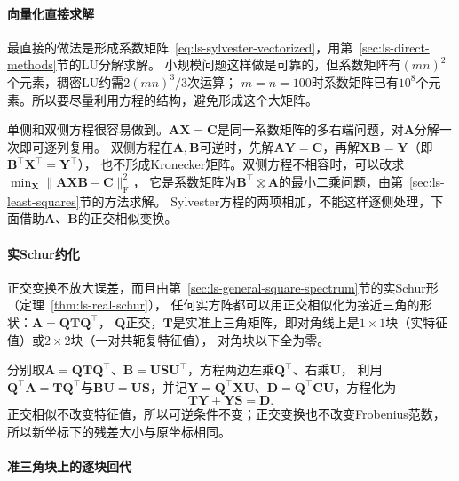 \paragraph{向量化直接求解}

最直接的做法是形成系数矩阵~\eqref{eq:ls-sylvester-vectorized}，用第~\ref{sec:ls-direct-methods}节的LU分解求解。
小规模问题这样做是可靠的，但系数矩阵有$(mn)^2$个元素，稠密LU约需$2(mn)^3/3$次运算；
$m=n=100$时系数矩阵已有$10^8$个元素。所以要尽量利用方程的结构，避免形成这个大矩阵。

单侧和双侧方程很容易做到。$\bm A\bm X=\bm C$是同一系数矩阵的多右端问题，对$\bm A$分解一次即可逐列复用。
双侧方程在$\bm A,\bm B$可逆时，先解$\bm A\bm Y=\bm C$，再解$\bm X\bm B=\bm Y$（即$\bm B^\top\bm X^\top=\bm Y^\top$），
也不形成Kronecker矩阵。双侧方程不相容时，可以改求$\min_{\bm X}\lVert\bm A\bm X\bm B-\bm C\rVert_{\mathrm F}^2$，
它是系数矩阵为$\bm B^\top\otimes\bm A$的最小二乘问题，由第~\ref{sec:ls-least-squares}节的方法求解。
Sylvester方程的两项相加，不能这样逐侧处理，下面借助$\bm A$、$\bm B$的正交相似变换。

\paragraph{实Schur约化}
\label{sec:ls-sylvester-schur}

正交变换不放大误差，而且由第~\ref{sec:ls-general-square-spectrum}节的实Schur形（定理~\ref{thm:ls-real-schur}），
任何实方阵都可以用正交相似化为接近三角的形状：$\bm A=\bm Q\bm T\bm Q^\top$，
$\bm Q$正交，$\bm T$是实准上三角矩阵，即对角线上是$1\times1$块（实特征值）或$2\times2$块（一对共轭复特征值），
对角块以下全为零。

分别取$\bm A=\bm Q\bm T\bm Q^\top$、$\bm B=\bm U\bm S\bm U^\top$，方程两边左乘$\bm Q^\top$、右乘$\bm U$，
利用$\bm Q^\top\bm A=\bm T\bm Q^\top$与$\bm B\bm U=\bm U\bm S$，并记$\bm Y=\bm Q^\top\bm X\bm U$、$\bm D=\bm Q^\top\bm C\bm U$，方程化为
\begin{equation}
 \bm T\bm Y+\bm Y\bm S=\bm D.
 \label{eq:ls-sylvester-transformed}
\end{equation}
正交相似不改变特征值，所以可逆条件不变；正交变换也不改变Frobenius范数，所以新坐标下的残差大小与原坐标相同。

\paragraph{准三角块上的逐块回代}

